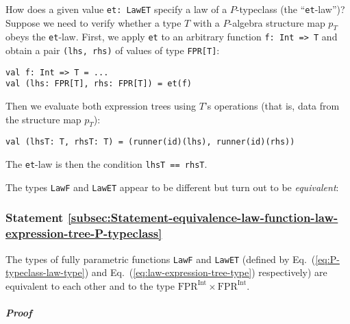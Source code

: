 How does a given value \lstinline!et: LawET!
specify a law of a $P$-typeclass (the \textsf{``}\lstinline!et!-law\textsf{''})?
Suppose we need to verify whether a type $T$ with a $P$-algebra
structure map $p_{T}$ obeys the \lstinline!et!-law.
First, we apply \lstinline!et!
to an arbitrary function \lstinline!f: Int => T!
and obtain a pair \lstinline!(lhs, rhs)!
of values of type \lstinline!FPR[T]!:
\begin{lstlisting}
val f: Int => T = ...
val (lhs: FPR[T], rhs: FPR[T]) = et(f)
\end{lstlisting}
Then we evaluate both expression trees using $T$\textsf{'}s operations (that
is, data from the structure map $p_{T}$):
\begin{lstlisting}
val (lhsT: T, rhsT: T) = (runner(id)(lhs), runner(id)(rhs))
\end{lstlisting}
The \lstinline!et!-law
is then the condition \lstinline!lhsT == rhsT!.

The types \lstinline!LawF!
and \lstinline!LawET! appear
to be different but turn out to be \emph{equivalent}:

\subsubsection{Statement \label{subsec:Statement-equivalence-law-function-law-expression-tree-P-typeclass}\ref{subsec:Statement-equivalence-law-function-law-expression-tree-P-typeclass}}

The types of fully parametric functions \lstinline!LawF!
and \lstinline!LawET! (defined
by Eq.~(\ref{eq:P-typeclass-law-type}) and Eq.~(\ref{eq:law-expression-tree-type})
respectively) are equivalent to each other and to the type $\text{FPR}^{\text{Int}}\times\text{FPR}^{\text{Int}}$.

\subparagraph{Proof}

